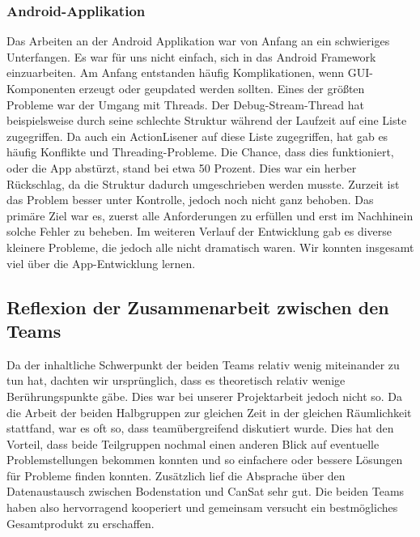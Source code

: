 \subsubsection{Android-Applikation}
Das Arbeiten an der Android Applikation war von Anfang an ein schwieriges Unterfangen. Es war für uns nicht einfach, sich in das Android Framework einzuarbeiten. Am Anfang entstanden häufig Komplikationen, wenn GUI-Komponenten erzeugt oder geupdated werden sollten. Eines der größten Probleme war der Umgang mit Threads. Der Debug-Stream-Thread hat beispielsweise durch seine schlechte Struktur während der Laufzeit auf eine Liste zugegriffen. Da auch ein ActionLisener auf diese Liste zugegriffen, hat gab es häufig Konflikte und Threading-Probleme. Die Chance, dass dies funktioniert, oder die App abstürzt, stand bei etwa 50 Prozent. Dies war ein herber Rückschlag, da die Struktur dadurch umgeschrieben werden musste. Zurzeit ist das Problem besser unter Kontrolle, jedoch noch nicht ganz behoben. Das primäre Ziel war es, zuerst alle Anforderungen zu erfüllen und erst im Nachhinein solche Fehler zu beheben. Im weiteren Verlauf der Entwicklung gab es diverse kleinere Probleme, die jedoch alle nicht dramatisch waren. Wir konnten insgesamt viel über die App-Entwicklung lernen.

\subsection{Reflexion der Zusammenarbeit zwischen den Teams}
Da der inhaltliche Schwerpunkt der beiden Teams relativ wenig miteinander zu tun hat, dachten wir ursprünglich, dass es theoretisch relativ wenige Berührungspunkte gäbe. Dies war bei unserer Projektarbeit jedoch nicht so. Da die Arbeit der beiden Halbgruppen zur gleichen Zeit in der gleichen Räumlichkeit stattfand, war es oft so, dass teamübergreifend diskutiert wurde. Dies hat den Vorteil, dass beide Teilgruppen nochmal einen anderen Blick auf eventuelle Problemstellungen bekommen konnten und so einfachere oder bessere Lösungen für Probleme finden konnten. Zusätzlich lief die Absprache über den Datenaustausch zwischen Bodenstation und CanSat sehr gut. Die beiden Teams haben also hervorragend kooperiert und gemeinsam versucht ein bestmögliches Gesamtprodukt zu erschaffen.
